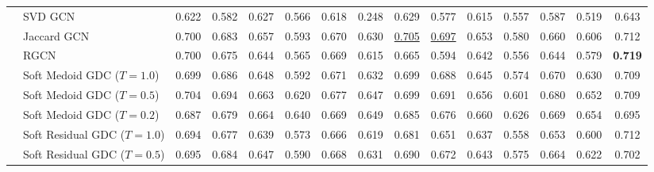 \documentclass{article} %
\begin{document}
\begin{table}
{\begin{tabular}{llccccccccccccc}
                           & SVD GCN &              0.622 &              0.582 &              0.627 &              0.566 &              0.618 &              0.248 &              0.629 &              0.577 &              0.615 &              0.557 &              0.587 &              0.519 &              0.643 \\
                           & Jaccard GCN &              0.700 &              0.683 &              0.657 &              0.593 &              0.670 &              0.630 &  \underline{0.705} &  \underline{0.697} &              0.653 &              0.580 &              0.660 &              0.606 &              0.712 \\
                           & RGCN &              0.700 &              0.675 &              0.644 &              0.565 &              0.669 &              0.615 &              0.665 &              0.594 &              0.642 &              0.556 &              0.644 &              0.579 &     \textbf{0.719} \\
                           & Soft Medoid GDC ($T=1.0$) &              0.699 &              0.686 &              0.648 &              0.592 &              0.671 &              0.632 &              0.699 &              0.688 &              0.645 &              0.574 &              0.670 &              0.630 &              0.709 \\
                           & Soft Medoid GDC ($T=0.5$) &              0.704 &              0.694 &              0.663 &              0.620 &              0.677 &              0.647 &              0.699 &              0.691 &              0.656 &              0.601 &              0.680 &              0.652 &              0.709 \\
                           & Soft Medoid GDC ($T=0.2$) &              0.687 &              0.679 &              0.664 &              0.640 &              0.669 &              0.649 &              0.685 &              0.676 &              0.660 &              0.626 &              0.669 &              0.654 &              0.695 \\
                           & Soft Residual GDC ($T=1.0$) &              0.694 &              0.677 &              0.639 &              0.573 &              0.666 &              0.619 &              0.681 &              0.651 &              0.637 &              0.558 &              0.653 &              0.600 &              0.712 \\
                           & Soft Residual GDC ($T=0.5$) &              0.695 &              0.684 &              0.647 &              0.590 &              0.668 &              0.631 &              0.690 &              0.672 &              0.643 &              0.575 &              0.664 &              0.622 &              0.702 \\

\end{tabular}}
\end{table}
\end{document}
